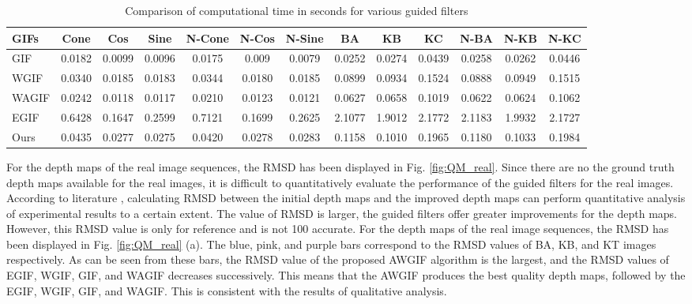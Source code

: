 \documentclass[a4paper,fleqn]{cas-dc}
\begin{document}
\begin{table*}[]
	\centering
\caption{Comparison of computational time in seconds for various guided filters}
\label{ComputationalTime}
	\begin{tabular}{p{.8cm}<{\raggedleft}|ccc|ccc|ccc|ccc}
		\hline
		GIFs & Cone  & Cos  & Sine   & N-Cone  & N-Cos  & N-Sine & BA  & KB  & KC  & N-BA  & N-KB  & N-KC  \\ \hline
		GIF & 0.0182  & 0.0099  & 0.0096  & 0.0175  & 0.009 & 0.0079  & 0.0252  & 0.0274  & 0.0439  & 0.0258  & 0.0262 & 0.0446 \\
		WGIF & 0.0340  & 0.0185  & 0.0183  & 0.0344  & 0.0180 & 0.0185 & 0.0899  & 0.0934  & 0.1524  & 0.0888  & 0.0949 & 0.1515 \\
		WAGIF & 0.0242  & 0.0118  & 0.0117  & 0.0210  & 0.0123 & 0.0121 & 0.0627  & 0.0658  & 0.1019  & 0.0622  & 0.0624 & 0.1062 \\
		EGIF & 0.6428  & 0.1647  & 0.2599  & 0.7121  & 0.1699 & 0.2625 & 2.1077  & 1.9012  & 2.1772  & 2.1183  & 1.9932  & 2.1727  \\
		Ours & 0.0435  & 0.0277  & 0.0275  & 0.0420  & 0.0278 & 0.0283 & 0.1158  & 0.1010  & 0.1965  & 0.1180  & 0.1033 & 0.1984 \\ \hline
	\end{tabular}
	\vspace*{-0.4cm}
\end{table*}

For the depth maps of the real image sequences, the RMSD has been displayed in Fig. \ref{fig:QM_real}. Since there are no the ground truth depth maps available for the real images, it is difficult to quantitatively evaluate the performance of the guided filters for the real images. According to literature \cite{ali2021guided}, calculating RMSD between the initial depth maps and the improved depth maps can perform quantitative analysis of experimental results to a certain extent. The value of RMSD is larger, the guided filters offer greater improvements for the depth maps. However, this RMSD value is only for reference and is not 100 accurate. For the depth maps of the real image sequences, the RMSD has been displayed in Fig. \ref{fig:QM_real} (a). The blue, pink, and purple bars correspond to the RMSD values of BA, KB, and KT images respectively. As can be seen from these bars, the RMSD value of the proposed AWGIF algorithm is the largest, and the RMSD values of EGIF, WGIF, GIF, and WAGIF decreases successively. This means that the AWGIF produces the best quality depth maps, followed by the EGIF, WGIF, GIF, and WAGIF. This is consistent with the results of qualitative analysis.
\end{document}
